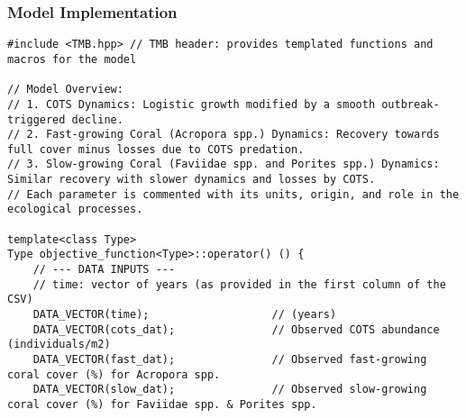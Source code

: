 \subsubsection{Model Implementation}
\begin{lstlisting}
#include <TMB.hpp> // TMB header: provides templated functions and macros for the model

// Model Overview:
// 1. COTS Dynamics: Logistic growth modified by a smooth outbreak-triggered decline.
// 2. Fast-growing Coral (Acropora spp.) Dynamics: Recovery towards full cover minus losses due to COTS predation.
// 3. Slow-growing Coral (Faviidae spp. and Porites spp.) Dynamics: Similar recovery with slower dynamics and losses by COTS.
// Each parameter is commented with its units, origin, and role in the ecological processes.

template<class Type>
Type objective_function<Type>::operator() () {
    // --- DATA INPUTS ---
    // time: vector of years (as provided in the first column of the CSV)
    DATA_VECTOR(time);                   // (years)
    DATA_VECTOR(cots_dat);               // Observed COTS abundance (individuals/m2)
    DATA_VECTOR(fast_dat);               // Observed fast-growing coral cover (%) for Acropora spp.
    DATA_VECTOR(slow_dat);               // Observed slow-growing coral cover (%) for Faviidae spp. & Porites spp.
    

\end{lstlisting}
